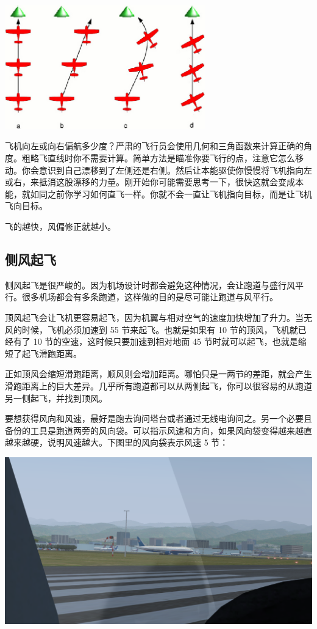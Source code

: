 \begin{itemize}
\centerline{
  \includegraphics[width=0.65\textwidth]{img/basic_tutorial/wind-force}
}

飞机向左或向右偏航多少度？严肃的飞行员会使用几何和三角函数来计算正确的角度。粗略飞直线时你不需要计算。简单方法是瞄准你要飞行的点，注意它怎么移动。你会意识到自己漂移到了左侧还是右侧。然后让本能驱使你慢慢将飞机指向左或右，来抵消这股漂移的力量。刚开始你可能需要思考一下，很快这就会变成本能，就如同之前你学习如何直飞一样。你就不会一直让飞机指向目标，而是让飞机飞向目标。

飞的越快，风偏修正就越小。

\subsection{侧风起飞}
\label{sec:Swsw}

侧风起飞是很严峻的。因为机场设计时都会避免这种情况，会让跑道与盛行风平行。很多机场都会有多条跑道，这样做的目的是尽可能让跑道与风平行。

顶风起飞会让飞机更容易起飞，因为机翼与相对空气的速度加快增加了升力。当无风的时候，飞机必须加速到 55 节来起飞。也就是如果有 10 节的顶风，飞机就已经有了 10 节的空速，这时候只要加速到相对地面 45 节时就可以起飞，也就是缩短了起飞滑跑距离。

正如顶风会缩短滑跑距离，顺风则会增加距离。哪怕只是一两节的差距，就会产生滑跑距离上的巨大差异。几乎所有跑道都可以从两侧起飞，你可以很容易的从跑道另一侧起飞，并找到顶风。

要想获得风向和风速，最好是跑去询问塔台或者通过无线电询问之。另一个必要且备份的工具是跑道两旁的风向袋。可以指示风速和方向，如果风向袋变得越来越直越来越硬，说明风速越大。下图里的风向袋表示风速 5 节：

\begin{center}
\includegraphics[width=\textwidth]{img/basic_tutorial/windsock-5kts}
\end{center}


\end{itemize}
